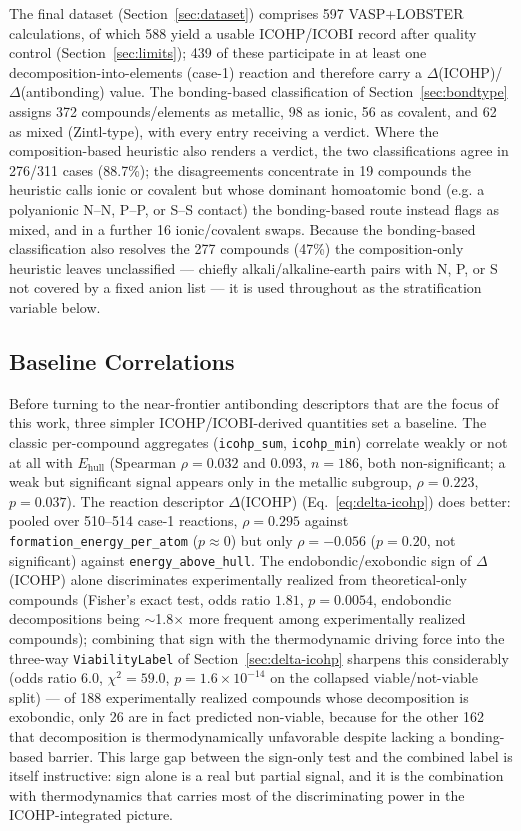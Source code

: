 \documentclass[journal=jpccck,manuscript=article]{achemso}
\begin{document}
The final dataset (Section~\ref{sec:dataset}) comprises 597 VASP+LOBSTER
calculations, of which 588 yield a usable ICOHP/ICOBI record after quality
control (Section~\ref{sec:limits}); 439 of these participate in at least one
decomposition-into-elements (case-1) reaction and therefore carry a
$\Delta$(ICOHP)/$\Delta$(antibonding) value. The bonding-based classification
of Section~\ref{sec:bondtype} assigns 372 compounds/elements as metallic, 98
as ionic, 56 as covalent, and 62 as mixed (Zintl-type), with every entry
receiving a verdict. Where the composition-based heuristic also renders a
verdict, the two classifications agree in 276/311 cases (88.7\%); the
disagreements concentrate in 19 compounds the heuristic calls ionic or
covalent but whose dominant homoatomic bond (e.g. a polyanionic N--N, P--P,
or S--S contact) the bonding-based route instead flags as mixed, and in a
further 16 ionic/covalent swaps. Because the bonding-based classification
also resolves the 277 compounds (47\%) the composition-only heuristic leaves
unclassified --- chiefly alkali/alkaline-earth pairs with N, P, or S not
covered by a fixed anion list --- it is used throughout as the
stratification variable below.

\subsection{Baseline Correlations}
\label{sec:res-baseline}

Before turning to the near-frontier antibonding descriptors that are the
focus of this work, three simpler ICOHP/ICOBI-derived quantities set a
baseline. The classic per-compound aggregates (\texttt{icohp\_sum},
\texttt{icohp\_min}) correlate weakly or not at all with
$E_\text{hull}$ (Spearman $\rho = 0.032$ and $0.093$, $n=186$, both
non-significant; a weak but significant signal appears only in the metallic
subgroup, $\rho=0.223$, $p=0.037$). The reaction descriptor $\Delta$(ICOHP)
(Eq.~\ref{eq:delta-icohp}) does better: pooled over 510--514 case-1
reactions, $\rho=0.295$ against \texttt{formation\_energy\_per\_atom}
($p\approx0$) but only $\rho=-0.056$ ($p=0.20$, not significant) against
\texttt{energy\_above\_hull}. The endobondic/exobondic sign of
$\Delta$(ICOHP) alone discriminates experimentally realized from
theoretical-only compounds (Fisher's exact test, odds ratio $1.81$,
$p=0.0054$, endobondic decompositions being $\sim$1.8$\times$ more frequent
among experimentally realized compounds); combining that sign with the
thermodynamic driving force into the three-way \texttt{ViabilityLabel} of
Section~\ref{sec:delta-icohp} sharpens this considerably (odds ratio
$6.0$, $\chi^2=59.0$, $p=1.6\times10^{-14}$ on the collapsed viable/not-viable
split) --- of 188 experimentally realized compounds whose decomposition is
exobondic, only 26 are in fact predicted non-viable, because for the other
162 that decomposition is thermodynamically unfavorable despite lacking a
bonding-based barrier. This large gap between the sign-only test and the
combined label is itself instructive: sign alone is a real but partial
signal, and it is the combination with thermodynamics that carries most of
the discriminating power in the ICOHP-integrated picture.
\end{document}
